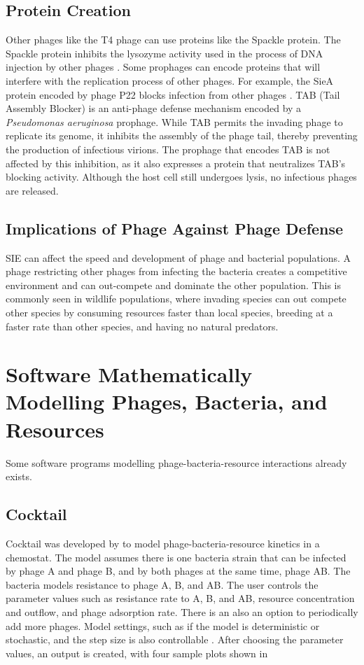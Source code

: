 \subsection{Protein Creation}
Other phages like the T4 phage can use proteins like the Spackle protein. 
The Spackle protein inhibits the lysozyme activity used in the process of DNA injection by other phages \cite{bucherPhageMachineSIEence2024, kanamaruStructureFunctionT42020}. 
Some prophages can encode proteins that will interfere with the replication process of other phages. 
For example, the SieA protein encoded by phage P22 blocks infection from other phages \cite{leavittBacteriophageP22SieAmediated2024}. \newline
TAB (Tail Assembly Blocker) is an anti-phage defense mechanism encoded by a \textit{Pseudomonas aeruginosa} prophage. 
While TAB permits the invading phage to replicate its genome, it inhibits the assembly of the phage tail, thereby preventing the production of infectious virions. 
The prophage that encodes TAB is not affected by this inhibition, as it also expresses a protein that neutralizes TAB's blocking activity. 
Although the host cell still undergoes lysis, no infectious phages are released.

\subsection{Implications of Phage Against Phage Defense}
SIE can affect the speed and development of phage and bacterial populations. A phage restricting other phages from infecting the bacteria creates a competitive environment and can out-compete and dominate the other population. 
This is commonly seen in wildlife populations, where invading species can out compete other species by consuming resources faster than local species, breeding at a faster rate than other species, and having no natural predators. 

\section{Software Mathematically Modelling Phages, Bacteria, and Resources}
Some software programs modelling phage-bacteria-resource interactions already exists. 

\subsection{Cocktail}
Cocktail was developed by \citet{nilssonCocktailComputerProgram2022} to model phage-bacteria-resource kinetics in a chemostat. 
The model assumes there is one bacteria strain that can be infected by phage A and phage B, and by both phages at the same time, phage AB. 
The bacteria models resistance to phage A, B, and AB. 
The user controls the parameter values such as resistance rate to A, B, and AB, resource concentration and outflow, and phage adsorption rate. 
There is an also an option to periodically add more phages. 
Model settings, such as if the model is deterministic or stochastic, and the step size is also controllable \cite{nilssonCocktailComputerProgram2022}. 
After choosing the parameter values, an output is created, with four sample plots shown in 

